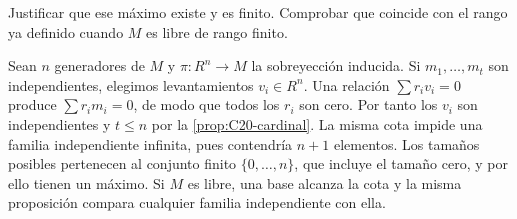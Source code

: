 \begin{ejer}\label{ejer:C21-rango-finito}
Justificar que ese máximo existe y es finito. Comprobar que coincide con el rango ya definido cuando $M$ es libre de rango finito.
\end{ejer}
\begin{sol}
Sean $n$ generadores de $M$ y $\pi:R^n\to M$ la sobreyección inducida. Si $m_1,\ldots,m_t$ son independientes, elegimos levantamientos $v_i\in R^n$. Una relación $\sum r_iv_i=0$ produce $\sum r_im_i=0$, de modo que todos los $r_i$ son cero. Por tanto los $v_i$ son independientes y $t\leq n$ por la \cref{prop:C20-cardinal}. La misma cota impide una familia independiente infinita, pues contendría $n+1$ elementos. Los tamaños posibles pertenecen al conjunto finito $\{0,\ldots,n\}$, que incluye el tamaño cero, y por ello tienen un máximo. Si $M$ es libre, una base alcanza la cota y la misma proposición compara cualquier familia independiente con ella.
\end{sol}
